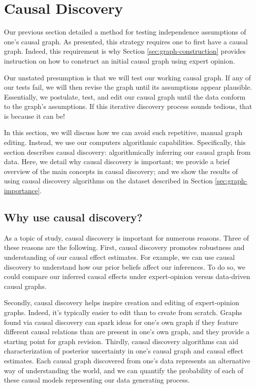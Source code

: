 \section{Causal Discovery}
\label{sec:causal-discovery}

Our previous section detailed a method for testing independence assumptions of one's causal graph.
As presented, this strategy requires one to first have a causal graph.
Indeed, this requirement is why Section \ref{sec:graph-construction} provides instruction on how to construct an initial causal graph using expert opinion.

Our unstated presumption is that we will test our working causal graph.
If any of our tests fail, we will then revise the graph until its assumptions appear plausible.
Essentially, we postulate, test, and edit our causal graph until the data conform to the graph's assumptions.
If this iterative discovery process sounds tedious, that is because it can be!

In this section, we will discuss how we can avoid such repetitive, manual graph editing.
Instead, we use our computers algorithmic capabilities.
Specifically, this section describes causal discovery:
algorithmically inferring our causal graph from data.
Here, we detail why causal discovery is important;
we provide a brief overview of the main concepts in causal discovery;
and we show the results of using causal discovery algorithms on the dataset described in Section \ref{sec:graph-importance}.

\subsection{Why use causal discovery?}
\label{sec:why-causal-discovery}

As a topic of study, causal discovery is important for numerous reasons.
Three of these reasons are the following.
First, causal discovery promotes robustness and understanding of our causal effect estimates.
For example, we can use causal discovery to understand how our prior beliefs affect our inferences.
To do so, we could compare our inferred causal effects under expert-opinion versus data-driven causal graphs.

Secondly, causal discovery helps inspire creation and editing of expert-opinion graphs.
Indeed, it's typically easier to edit than to create from scratch.
Graphs found via causal discovery can spark ideas for one's own graph if they feature different causal relations than are present in one's own graph, and they provide a starting point for graph revision.
Thirdly, causal discovery algorithms can aid characterization of posterior uncertainty in one's causal graph and causal effect estimates.
Each causal graph discovered from one's data represents an alternative way of understanding the world, and we can quantify the probability of each of these causal models representing our data generating process.


